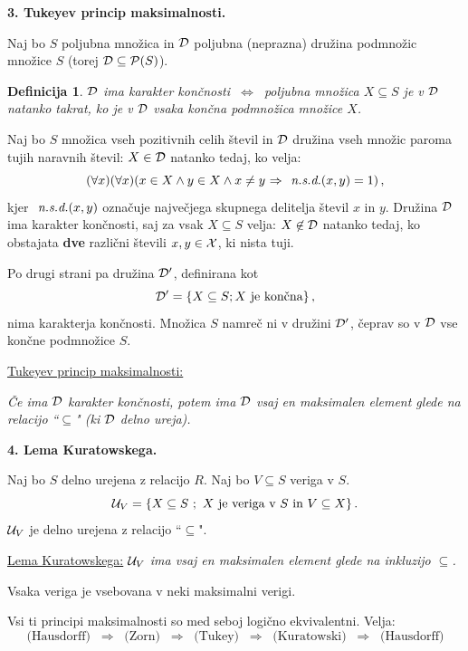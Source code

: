 \documentclass[11pt,paper=b5,footinclude,headinclude]{scrbook} %
\newcounter{example}
\def\sledi {{~\Rightarrow~}}
\def\cee {{~\Leftrightarrow~}}
\newtheorem*{definicija}{Definicija}
\begin{document}
\bigskip
\bigskip
\textbf{3. Tukeyev princip maksimalnosti.}

Naj bo $S$ poljubna množica in ${\cal D}$ poljubna (neprazna) družina podmnožic množice $S$ (torej ${\cal D}\subseteq {\cal P}(S)$).

\begin{definicija}
${\cal D}$  ima {\em karakter končnosti} $\cee$ poljubna množica $X\subseteq S$ je v ${\cal D}$ natanko takrat, ko je v ${\cal D}$ vsaka {\em končna} podmnožica množice $X$.
\end{definicija}

\medskip
\begin{example*}
Naj bo $S$ množica vseh pozitivnih celih števil in ${\cal D}$ družina vseh množic paroma tujih naravnih števil:
$X\in {\cal D}$ natanko tedaj, ko velja:
$$(\forall x)(\forall x)(x\in X \land y\in X\land x\neq y\sledi \emph{ n.s.d.}(x,y) = 1)\,,$$
kjer $\emph{ n.s.d.}(x,y)$ označuje največjega skupnega delitelja števil $x$ in $y$.
Družina ${\cal D}$ ima karakter končnosti, saj za vsak $X\subseteq S$ velja:
$X\not\in {\cal D}$ natanko tedaj, ko obstajata \textbf{dve} različni števili $x,y\in {\cal X}$,  ki nista tuji.

Po drugi strani pa družina ${\cal D}'$, definirana kot
$${\cal D}' = \{X\subseteq S; X \textrm{ je končna}\}\,,$$
nima karakterja končnosti. Množica $S$ namreč ni v družini ${\cal D}'$,
čeprav so v ${\cal D}$ vse končne podmnožice $S$.\end{example*}

\bigskip
\underline{Tukeyev princip maksimalnosti:}

{\em Če ima ${\cal D}$ karakter končnosti, potem ima ${\cal D}$ vsaj en maksimalen element glede na relacijo ``$\subseteq$" (ki ${\cal D}$ delno ureja).}

\bigskip

\textbf{4. Lema Kuratowskega.}

Naj bo $S$ delno urejena z relacijo $R$. Naj bo $V\subseteq S$ veriga v $S$.
$${\cal U}_V = \{X\subseteq S~;~X\textrm{ je veriga v }S \textrm{ in } V\subseteq X\}\,.$$
${\cal U}_V$ je delno urejena z relacijo ``$\subseteq$".

\underline{Lema Kuratowskega:}
{\em ${\cal U}_V$ ima vsaj en maksimalen element glede na inkluzijo $\subseteq$.}

\medskip
Vsaka veriga je vsebovana v neki maksimalni verigi.


\bigskip

Vsi ti principi maksimalnosti so med seboj logično ekvivalentni.
Velja:
$$\textrm{(Hausdorff) $\sledi$ (Zorn) $\sledi$ (Tukey) $\sledi$ (Kuratowski) $\sledi$ (Hausdorff)}$$
\end{document}
